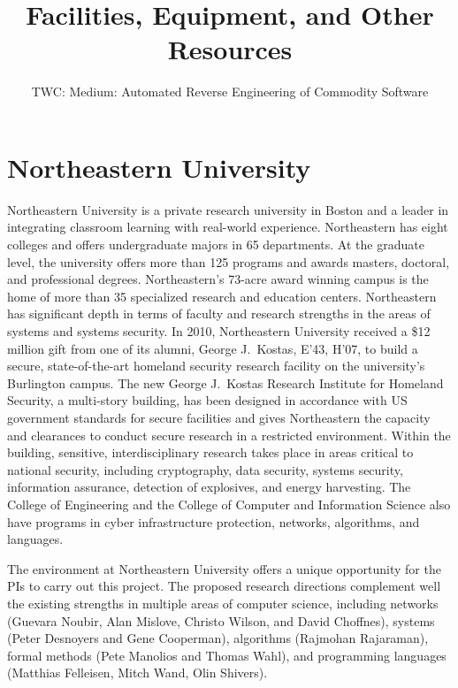 \documentclass[letterpaper,11pt]{scrartcl}
\newcommand{\thetitle}{TWC: Medium: Automated Reverse Engineering of Commodity Software\xspace}
\begin{document}

\title{Facilities, Equipment, and Other Resources}
\subtitle{\thetitle}
\author{}
\date{}
\maketitle

\section*{Northeastern University}

Northeastern University is a private research university in Boston and a
leader in integrating classroom learning with real-world experience.
Northeastern has eight colleges and offers undergraduate majors in 65
departments. At the graduate level, the university offers more than 125
programs and awards masters, doctoral, and professional degrees.
Northeastern's 73-acre award winning campus is the home of more than 35
specialized research and education centers.  Northeastern has significant
depth in terms of faculty and research strengths in the areas of systems and
systems security. In 2010, Northeastern University received a \$12 million
gift from one of its alumni, George J.~Kostas, E'43, H'07, to build a secure,
state-of-the-art homeland security research facility on the university's
Burlington campus. The new George J.~Kostas Research Institute for Homeland
Security, a multi-story building, has been designed in accordance with US
government standards for secure facilities and gives Northeastern the capacity
and clearances to conduct secure research in a restricted environment. Within
the building, sensitive, interdisciplinary research takes place in areas
critical to national security, including cryptography, data security, systems
security, information assurance, detection of explosives, and energy
harvesting.  The College of Engineering and the College of Computer and
Information Science also have programs in cyber infrastructure protection,
networks, algorithms, and languages.

The environment at Northeastern University offers a unique opportunity for the
PIs to carry out this project.  The proposed research directions complement
well the existing strengths in multiple areas of computer science, including
networks (Guevara Noubir, Alan Mislove, Christo Wilson, and David Choffnes),
systems (Peter Desnoyers and Gene Cooperman), algorithms (Rajmohan Rajaraman),
formal methods (Pete Manolios and Thomas Wahl), and programming languages
(Matthias Felleisen, Mitch Wand, Olin Shivers).
\end{document}
